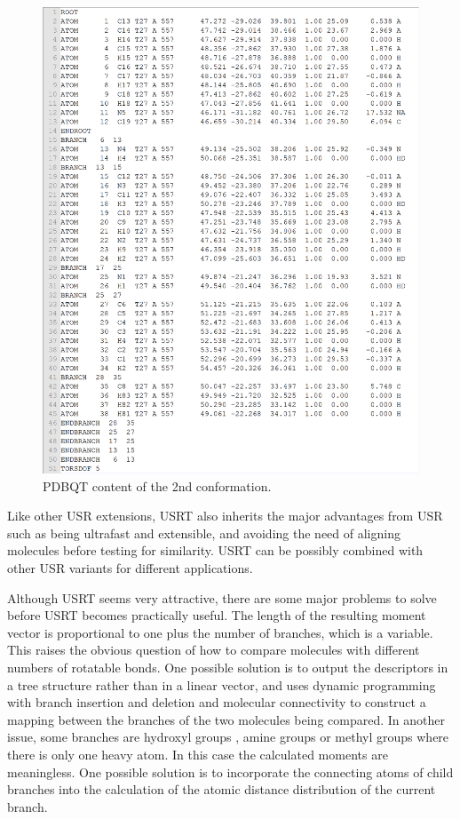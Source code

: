 \begin{figure}
\centering
\includegraphics[width=\linewidth]{../usrt/T27DockedPDBQT.png}
\caption{PDBQT content of the 2nd conformation.}
\label{usr:T27DockedPDBQT}
\end{figure}

Like other USR extensions, USRT also inherits the major advantages from USR such as being ultrafast and extensible, and avoiding the need of aligning molecules before testing for similarity. USRT can be possibly combined with other USR variants \citep{1333,1338,1331} for different applications.

Although USRT seems very attractive, there are some major problems to solve before USRT becomes practically useful. The length of the resulting moment vector is proportional to one plus the number of branches, which is a variable. This raises the obvious question of how to compare molecules with different numbers of rotatable bonds. One possible solution is to output the descriptors in a tree structure rather than in a linear vector, and uses dynamic programming with branch insertion and deletion and molecular connectivity to construct a mapping between the branches of the two molecules being compared. In another issue, some branches are hydroxyl groups , amine groups  or methyl groups  where there is only one heavy atom. In this case the calculated moments are meaningless. One possible solution is to incorporate the connecting atoms of child branches into the calculation of the atomic distance distribution of the current branch.

